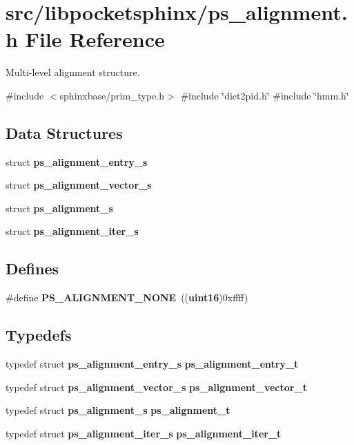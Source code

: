 \section{src/libpocketsphinx/ps\-\_\-alignment.h \-File \-Reference}
\label{ps__alignment_8h}


\-Multi-\/level alignment structure.  


{\ttfamily \#include $<$sphinxbase/prim\-\_\-type.\-h$>$}\*
{\ttfamily \#include \char`\"{}dict2pid.\-h\char`\"{}}\*
{\ttfamily \#include \char`\"{}hmm.\-h\char`\"{}}\*
\subsection*{\-Data \-Structures}
\begin{DoxyCompactItemize}
\item 
struct {\bf ps\-\_\-alignment\-\_\-entry\-\_\-s}
\item 
struct {\bf ps\-\_\-alignment\-\_\-vector\-\_\-s}
\item 
struct {\bf ps\-\_\-alignment\-\_\-s}
\item 
struct {\bf ps\-\_\-alignment\-\_\-iter\-\_\-s}
\end{DoxyCompactItemize}
\subsection*{\-Defines}
\begin{DoxyCompactItemize}
\item 
\#define {\bfseries \-P\-S\-\_\-\-A\-L\-I\-G\-N\-M\-E\-N\-T\-\_\-\-N\-O\-N\-E}~(({\bf uint16})0xffff)\label{ps__alignment_8h_aa6ddcfcd7598f1b50582dd5489e63e50}

\end{DoxyCompactItemize}
\subsection*{\-Typedefs}
\begin{DoxyCompactItemize}
\item 
typedef struct {\bf ps\-\_\-alignment\-\_\-entry\-\_\-s} {\bfseries ps\-\_\-alignment\-\_\-entry\-\_\-t}\label{ps__alignment_8h_abf89e73906a29024da48581f645e3c98}

\item 
typedef struct \*
{\bf ps\-\_\-alignment\-\_\-vector\-\_\-s} {\bfseries ps\-\_\-alignment\-\_\-vector\-\_\-t}\label{ps__alignment_8h_a57f06576e882630108c834e1a53a46d7}

\item 
typedef struct {\bf ps\-\_\-alignment\-\_\-s} {\bfseries ps\-\_\-alignment\-\_\-t}\label{ps__alignment_8h_a62983def0c01226bda91e6794a7f61f1}

\item 
typedef struct {\bf ps\-\_\-alignment\-\_\-iter\-\_\-s} {\bfseries ps\-\_\-alignment\-\_\-iter\-\_\-t}\label{ps__alignment_8h_afe48426a7d6bd0d7af628c4efc877ad8}

\end{DoxyCompactItemize}
